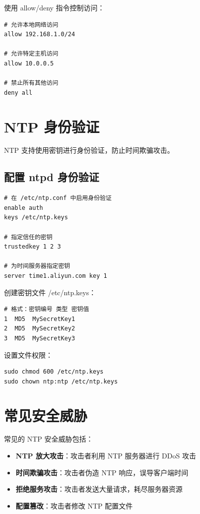 \documentclass[12pt,UTF8]{ctexbook}
\begin{document}
使用 allow/deny 指令控制访问：
\begin{verbatim}
# 允许本地网络访问
allow 192.168.1.0/24

# 允许特定主机访问
allow 10.0.0.5

# 禁止所有其他访问
deny all
\end{verbatim}

\section{NTP 身份验证}
\label{sec:ntp_authentication}

NTP 支持使用密钥进行身份验证，防止时间欺骗攻击。

\subsection{配置 ntpd 身份验证}

\begin{verbatim}
# 在 /etc/ntp.conf 中启用身份验证
enable auth
keys /etc/ntp.keys

# 指定信任的密钥
trustedkey 1 2 3

# 为时间服务器指定密钥
server time1.aliyun.com key 1
\end{verbatim}

创建密钥文件 /etc/ntp.keys：
\begin{verbatim}
# 格式：密钥编号 类型 密钥值
1  MD5  MySecretKey1
2  MD5  MySecretKey2
3  MD5  MySecretKey3
\end{verbatim}

设置文件权限：
\begin{verbatim}
sudo chmod 600 /etc/ntp.keys
sudo chown ntp:ntp /etc/ntp.keys
\end{verbatim}

\section{常见安全威胁}
\label{sec:security_threats}

常见的 NTP 安全威胁包括：

\begin{itemize}
    \item \textbf{NTP 放大攻击}：攻击者利用 NTP 服务器进行 DDoS 攻击
    \item \textbf{时间欺骗攻击}：攻击者伪造 NTP 响应，误导客户端时间
    \item \textbf{拒绝服务攻击}：攻击者发送大量请求，耗尽服务器资源
    \item \textbf{配置篡改}：攻击者修改 NTP 配置文件
\end{itemize}
\end{document}
